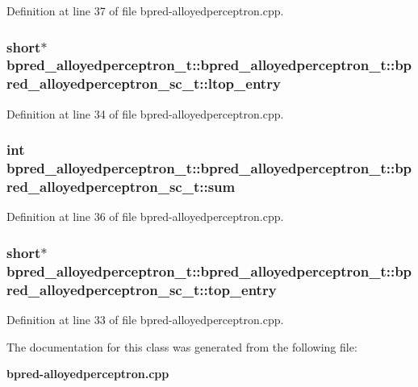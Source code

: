 Definition at line 37 of file bpred-alloyedperceptron.cpp.
\subsubsection[{ltop\_\-entry}]{\setlength{\rightskip}{0pt plus 5cm}short$\ast$ bpred\_\-alloyedperceptron\_\-t::bpred\_\-alloyedperceptron\_\-t::bpred\_\-alloyedperceptron\_\-sc\_\-t::ltop\_\-entry}\label{classbpred__alloyedperceptron__t_1_1bpred__alloyedperceptron__sc__t_f06a910eb7006c291f3ec310f2d9348e}




Definition at line 34 of file bpred-alloyedperceptron.cpp.
\subsubsection[{sum}]{\setlength{\rightskip}{0pt plus 5cm}int bpred\_\-alloyedperceptron\_\-t::bpred\_\-alloyedperceptron\_\-t::bpred\_\-alloyedperceptron\_\-sc\_\-t::sum}\label{classbpred__alloyedperceptron__t_1_1bpred__alloyedperceptron__sc__t_664426899518d67b6c65e632db7a0e03}




Definition at line 36 of file bpred-alloyedperceptron.cpp.
\subsubsection[{top\_\-entry}]{\setlength{\rightskip}{0pt plus 5cm}short$\ast$ bpred\_\-alloyedperceptron\_\-t::bpred\_\-alloyedperceptron\_\-t::bpred\_\-alloyedperceptron\_\-sc\_\-t::top\_\-entry}\label{classbpred__alloyedperceptron__t_1_1bpred__alloyedperceptron__sc__t_7311c7ee8493850538374d2deefb76c5}




Definition at line 33 of file bpred-alloyedperceptron.cpp.

The documentation for this class was generated from the following file:\begin{CompactItemize}
\item 
{\bf bpred-alloyedperceptron.cpp}\end{CompactItemize}
